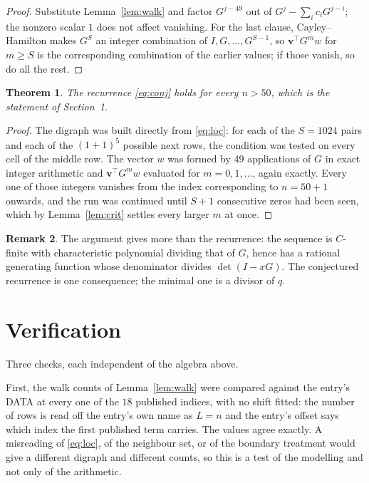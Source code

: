 \documentclass[11pt,a4paper]{article}
\theoremstyle{plain}
\newtheorem{theorem}{Theorem}
\theoremstyle{definition}
\newtheorem{remark}[theorem]{Remark}
\begin{document}
\begin{proof}
Substitute Lemma~\ref{lem:walk} and factor $G^{j-49}$ out of
$G^{j}-\sum_ic_iG^{j-i}$; the nonzero scalar $1$ does not affect
vanishing. For the last clause, Cayley--Hamilton makes $G^{S}$ an integer combination of
$I,G,\dots,G^{S-1}$, so $\mathbf{v}^{\!\top}G^{m}w$ for $m\ge S$ is the corresponding
combination of the earlier values; if those vanish, so do all the rest.
\end{proof}

\begin{theorem}
The recurrence \eqref{eq:conj} holds for every $n>50$, which is the statement of
Section~1.
\end{theorem}

\begin{proof}
The digraph was built directly from \eqref{eq:loc}: for each of the $S=1024$ pairs and each
of the $(1+1)^{5}$ possible next rows, the condition was tested on every cell of
the middle row. The vector $w$ was formed by $49$ applications of $G$ in exact integer
arithmetic and $\mathbf{v}^{\!\top}G^{m}w$ evaluated for $m=0,1,\dots$, again exactly.
Every one of those integers vanishes from the index corresponding to $n=50+1$ onwards,
and the run was continued until $S+1$ consecutive zeros had been seen, which by
Lemma~\ref{lem:crit} settles every larger $m$ at once.
\end{proof}

\begin{remark}
The argument gives more than the recurrence: the sequence is $C$-finite with characteristic
polynomial dividing that of $G$, hence has a rational generating function whose denominator
divides $\det(I-xG)$. The conjectured recurrence is one consequence; the minimal one is a
divisor of $q$.
\end{remark}

\section{Verification}

Three checks, each independent of the algebra above.

First, the walk counts of Lemma~\ref{lem:walk} were compared against the entry's DATA at
every one of the $18$ published indices, with no shift fitted: the number of rows is
read off the entry's own name as $L=n$ and the entry's offset says which index the first
published term carries. The values agree exactly. A misreading of \eqref{eq:loc}, of the
neighbour set, or of the boundary treatment would give a different digraph and different
counts, so this is a test of the modelling and not only of the arithmetic.
\end{document}
